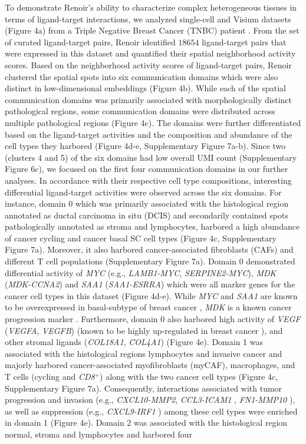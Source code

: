To demonstrate Renoir's ability to characterize complex heterogeneous tissues in terms of ligand-target interactions, we analyzed single-cell and Visium datasets (Figure 4a) from a Triple Negative Breast Cancer (TNBC) patient \citep{Wu2021}. From the set of curated ligand-target pairs, Renoir identified $18654$ ligand-target pairs that were expressed in this dataset and quantified their spatial neighborhood activity scores. Based on the neighborhood activity scores of ligand-target pairs, Renoir clustered the spatial spots into six communication domains which were also distinct in low-dimensional embeddings (Figure 4b). While each of the spatial communication domains was primarily associated with morphologically distinct pathological regions, some communication domains were distributed across multiple pathological regions (Figure 4c). The domains were further differentiated based on the ligand-target activities and the composition and abundance of the cell types they harbored (Figure 4d-e, Supplementary Figure 7a-b). Since two (clusters 4 and 5) of the six domains had low overall UMI count (Supplementary Figure 6c), we focused on the first four communication domains in our further analyses. In accordance with their respective cell type compositions, interesting differential ligand-target activities were observed across the six domains. For instance, domain 0 which was primarily associated with the histological region annotated as ductal carcinoma in situ (DCIS) and secondarily contained spots pathologically annotated as stroma and lymphocytes, harbored a high abundance of cancer cycling and cancer basal SC cell types (Figure 4c, Supplementary Figure 7a). Moreover, it also harbored cancer-associated fibroblasts (CAFs) and different T cell populations (Supplementary Figure 7a). Domain 0 demonstrated differential activity of \textit{MYC} (e.g., \textit{LAMB1-MYC}, \textit{SERPINE2-MYC}), \textit{MDK} (\textit{MDK-CCNA2}) and \textit{SAA1} (\textit{SAA1-ESRRA}) which were all marker genes for the cancer cell types in this dataset (Figure 4d-e). While \textit{MYC} and \textit{SAA1} are known to be overexpressed in basal-subtype of breast cancer \citep{doi:10.1073/pnas.191367098,doi:10.1073/pnas.1732912100,OT26566}, \textit{MDK} is a known cancer progression marker \citep{Filippou2020}. Furthermore, domain 0 also harbored high activity of \textit{VEGF} (\textit{VEGFA}, \textit{VEGFB}) (known to be highly up-regulated in breast cancer \citep{RIBATTI2016453,Harmey1998,Lewis2000}), and other stromal ligands (\textit{COL18A1}, \textit{COL4A1}) (Figure 4e). Domain 1 was associated with the histological regions lymphocytes and invasive cancer and majorly harbored cancer-associated myofibroblasts (myCAF), macrophages, and T cells (cycling and \textit{CD8}$^{+}$) along with the two cancer cell types (Figure 4c, Supplementary Figure 7a). Consequently, interactions associated with tumor progression and invasion (e.g., \textit{CXCL10-MMP2}, \textit{CCL3-ICAM1} \citep{doi:10.1073/pnas.1408556111}, \textit{FN1-MMP10} \citep{MCGOWAN20081566}), as well as suppression (e.g., \textit{CXCL9-IRF1} \citep{10.1158/1078-0432.CCR-19-1868}) among these cell types were enriched in domain 1 (Figure 4e). Domain 2 was associated with the histological region normal, stroma and lymphocytes and harbored four 